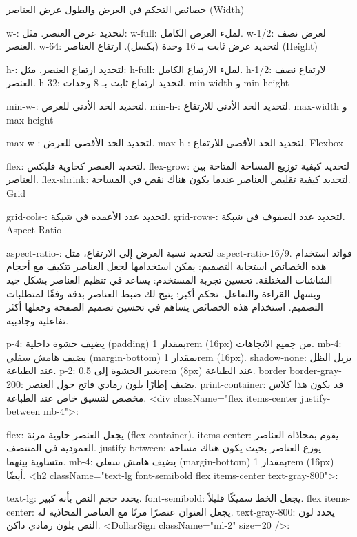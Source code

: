     خصائص التحكم في العرض والطول
    عرض العناصر (Width)

    w-: لتحديد عرض العنصر. مثل:
    w-full: لملء العرض الكامل.
    w-1/2: لعرض نصف العنصر.
    w-64: لتحديد عرض ثابت بـ 16 وحدة (بكسل).
    ارتفاع العناصر (Height)

    h-: لتحديد ارتفاع العنصر. مثل:
    h-full: لملء الارتفاع الكامل.
    h-1/2: لارتفاع نصف العنصر.
    h-32: لتحديد ارتفاع ثابت بـ 8 وحدات.
    min-width و min-height

    min-w-: لتحديد الحد الأدنى للعرض.
    min-h-: لتحديد الحد الأدنى للارتفاع.
    max-width و max-height

    max-w-: لتحديد الحد الأقصى للعرض.
    max-h-: لتحديد الحد الأقصى للارتفاع.
    Flexbox

    flex: لتحديد العنصر كحاوية فليكس.
    flex-grow: لتحديد كيفية توزيع المساحة المتاحة بين العناصر.
    flex-shrink: لتحديد كيفية تقليص العناصر عندما يكون هناك نقص في المساحة.
    Grid

    grid-cols-: لتحديد عدد الأعمدة في شبكة.
    grid-rows-: لتحديد عدد الصفوف في شبكة.
    Aspect Ratio

    aspect-ratio-: لتحديد نسبة العرض إلى الارتفاع، مثل aspect-ratio-16/9.
    فوائد استخدام هذه الخصائص
    استجابة التصميم: يمكن استخدامها لجعل العناصر تتكيف مع أحجام الشاشات المختلفة.
    تحسين تجربة المستخدم: يساعد في تنظيم العناصر بشكل جيد ويسهل القراءة والتفاعل.
    تحكم أكبر: يتيح لك ضبط العناصر بدقة وفقًا لمتطلبات التصميم.
    استخدام هذه الخصائص يساهم في تحسين تصميم الصفحة وجعلها أكثر تفاعلية وجاذبية.


    p-4: يضيف حشوة داخلية (padding) بمقدار 1rem (16px) من جميع الاتجاهات.
    mb-4: يضيف هامش سفلي (margin-bottom) بمقدار 1rem (16px).
    shadow-none: يزيل الظل عند الطباعة.
    p-2: يغير الحشوة إلى 0.5rem (8px) عند الطباعة.
    border border-gray-200: يضيف إطارًا بلون رمادي فاتح حول العنصر.
    print-container: قد يكون هذا كلاس مخصص لتنسيق خاص عند الطباعة.
    <div className="flex items-center justify-between mb-4">:

    flex: يجعل العنصر حاوية مرنة (flex container).
    items-center: يقوم بمحاذاة العناصر العمودية في المنتصف.
    justify-between: يوزع العناصر بحيث يكون هناك مساحة متساوية بينهما.
    mb-4: يضيف هامش سفلي (margin-bottom) بمقدار 1rem (16px) أيضًا.
    <h2 className="text-lg font-semibold flex items-center text-gray-800">:

    text-lg: يحدد حجم النص بأنه كبير.
    font-semibold: يجعل الخط سميكًا قليلاً.
    flex items-center: يجعل العنوان عنصرًا مرنًا مع العناصر المحاذية له.
    text-gray-800: يحدد لون النص بلون رمادي داكن.
    <DollarSign className="ml-2" size={20} />:

